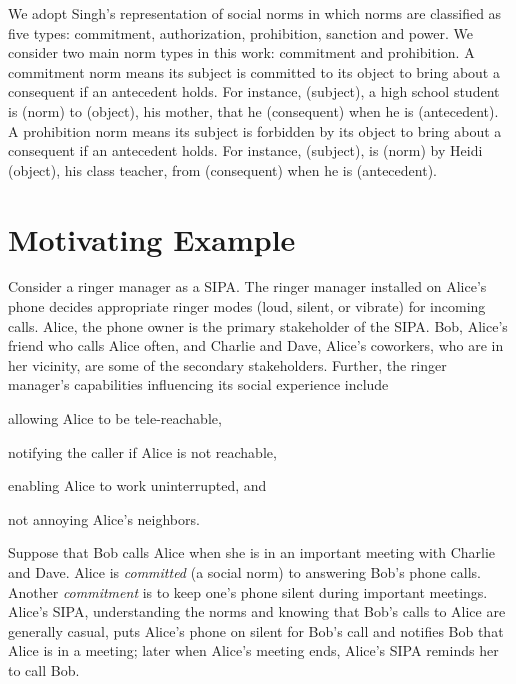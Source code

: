 We adopt Singh's
 representation of social norms in which norms
are classified as five types: commitment, authorization, prohibition,
sanction and power.
We consider two main norm types in this work: commitment and prohibition. 
A commitment norm means its subject is committed to its object to bring about a consequent if an antecedent holds. 
For instance,  (subject), a high school student is  (norm) to  (object), his mother, that he  (consequent) when he is  (antecedent).
A prohibition norm means its subject is forbidden by its object to bring about a consequent if an antecedent holds. 
For instance,  (subject), is  (norm) by Heidi (object), his class teacher, from  (consequent) when he is  (antecedent).


\section{Motivating Example}
\label{sec:intro-example}

\begin{example}
\label{ex:intro-ringer-meeting} 
Consider a ringer manager as a SIPA. The ringer manager installed on 
Alice's phone decides appropriate ringer modes (loud, silent, or 
vibrate) for incoming calls. Alice, the phone owner is the 
primary stakeholder of the SIPA. Bob, Alice's friend who 
calls Alice often, and Charlie and Dave, Alice's coworkers, who are in 
her vicinity, are some of the secondary stakeholders. Further, the ringer 
manager's capabilities influencing its social experience include
\begin{enumerate*}[label=(\arabic*)]
\item allowing Alice to be tele-reachable, 
\item notifying the caller if Alice is not reachable,
\item enabling Alice to work uninterrupted, and
\item not annoying Alice's neighbors.
\end{enumerate*}
\end{example}

Suppose that Bob calls Alice when she is in an important meeting with
Charlie and Dave. Alice is \emph{committed} (a social norm)
to answering Bob's phone calls. Another \emph{commitment} is to keep
one's phone silent during important meetings. Alice's SIPA,
understanding the norms and knowing that Bob's calls to Alice are
generally casual, puts Alice's phone on silent for Bob's call and
notifies Bob that Alice is in a meeting; later when Alice's meeting
ends, Alice's SIPA reminds her to call Bob.

